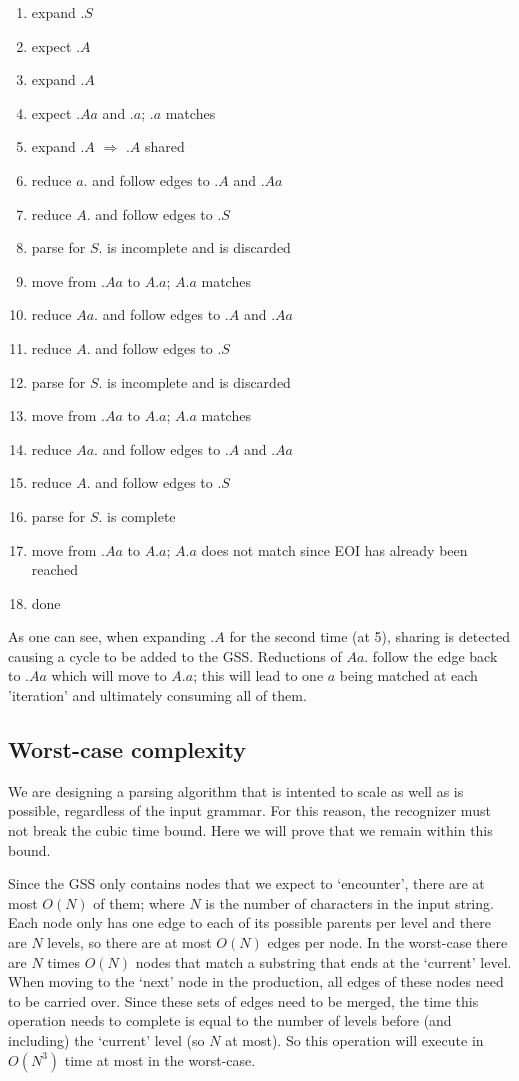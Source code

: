 \documentclass[a4paper,10pt]{article}
\begin{document}
\begin{enumerate}
 \setlength{\itemsep}{0pt}
 \setlength{\parskip}{0pt}
 \setlength{\parsep}{0pt}
 
 \item expand $.S$
 \item expect $.A$
 \item expand $.A$
 \item expect $.Aa$ and $.a$; $.a$ matches
 \item expand $.A$ $\Rightarrow$ $.A$ shared
 \item reduce $a.$ and follow edges to $.A$ and $.Aa$
 \item reduce $A.$ and follow edges to $.S$
 \item parse for $S.$ is incomplete and is discarded
 \item move from $.Aa$ to $A.a$; $A.a$ matches
 \item reduce $Aa.$ and follow edges to $.A$ and $.Aa$
 \item reduce $A.$ and follow edges to $.S$
 \item parse for $S.$ is incomplete and is discarded
 \item move from $.Aa$ to $A.a$; $A.a$ matches
 \item reduce $Aa.$ and follow edges to $.A$ and $.Aa$
 \item reduce $A.$ and follow edges to $.S$
 \item parse for $S.$ is complete
 \item move from $.Aa$ to $A.a$; $A.a$ does not match since EOI has already been reached
 \item done
\end{enumerate}
As one can see, when expanding $.A$ for the second time (at 5), sharing is detected causing a cycle to be added to the GSS. Reductions of $Aa.$ follow the edge back to $.Aa$ which will move to $A.a$; this will lead to one $a$ being matched at each 'iteration' and ultimately consuming all of them.

\subsection{Worst-case complexity}

We are designing a parsing algorithm that is intented to scale as well as is possible, regardless of the input grammar. For this reason, the recognizer must not break the cubic time bound. Here we will prove that we remain within this bound.

Since the GSS only contains nodes that we expect to `encounter', there are at most $O(N)$ of them; where $N$ is the number of characters in the input string. Each node only has one edge to each of its possible parents per level and there are $N$ levels, so there are at most $O(N)$ edges per node. In the worst-case there are $N$ times $O(N)$ nodes that match a substring that ends at the `current' level. When moving to the `next' node in the production, all edges of these nodes need to be carried over. Since these sets of edges need to be merged, the time this operation needs to complete is equal to the number of levels before (and including) the `current' level (so $N$ at most). So this operation will execute in $O(N^3)$ time at most in the worst-case.
\end{document}
